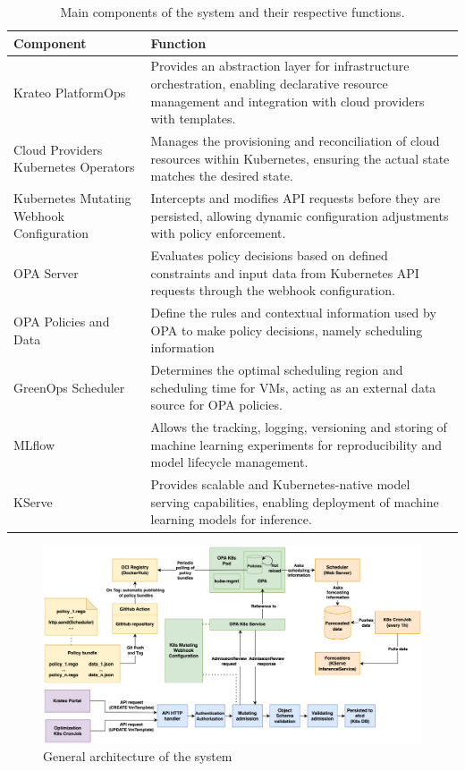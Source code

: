\begin{table}[t]
  \centering
  \renewcommand{\arraystretch}{1.3} %
  \begin{tabularx}{\textwidth}{| l | X |} %
    \hline
    \textbf{Component} & \textbf{Function} \\
    \hline
    Krateo PlatformOps & Provides an abstraction layer for infrastructure orchestration, enabling declarative resource management and integration with cloud providers with templates. \\
    \hline
    Cloud Providers Kubernetes Operators & Manages the provisioning and reconciliation of cloud resources within Kubernetes, ensuring the actual state matches the desired state. \\
    \hline
    Kubernetes Mutating Webhook Configuration & Intercepts and modifies API requests before they are persisted, allowing dynamic configuration adjustments with policy enforcement. \\
    \hline
    OPA Server & Evaluates policy decisions based on defined constraints and input data from Kubernetes API requests through the webhook configuration. \\
    \hline
    OPA Policies and Data & Define the rules and contextual information used by OPA to make policy decisions, namely scheduling information \\
    \hline
    GreenOps Scheduler & Determines the optimal scheduling region and scheduling time for VMs, acting as an external data source for OPA policies. \\
    \hline
    MLflow & Allows the tracking, logging, versioning and storing of machine learning experiments for reproducibility and model lifecycle management. \\
    \hline
    KServe & Provides scalable and Kubernetes-native model serving capabilities, enabling deployment of machine learning models for inference. \\
    \hline
  \end{tabularx}
  \caption{Main components of the system and their respective functions.}
  \label{tab:system_components}
\end{table}

\begin{figure}[t]
  \centering
  \includegraphics[width=1\linewidth]{images/architecture.png}
  \caption{General architecture of the system}
  \label{fig:architecture}
\end{figure}

